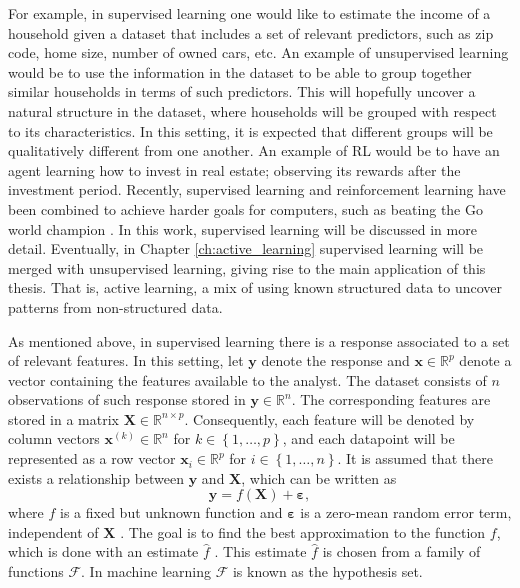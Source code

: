 For example, in supervised learning one would like to estimate the income of a household given a dataset that includes a set of relevant predictors, such as zip code, home size, number of owned cars, etc.
An example of unsupervised learning would be to use the information in the dataset to be able to group together similar households in terms of such predictors. This will hopefully uncover a natural structure in the dataset, where households will be grouped with respect to its characteristics. In this setting, it is expected that different groups will be qualitatively different from one another.
An example of RL would be to have an agent learning how to invest in real estate; observing its rewards after the investment period.
Recently, supervised learning and reinforcement learning have been combined to achieve harder goals for computers, such as beating the Go world champion \cite{silver2017mastering}.
In this work, supervised learning will be discussed in more detail. Eventually, in Chapter \ref{ch:active_learning} supervised learning will be merged with unsupervised learning, giving rise to the main application of this thesis. That is, active learning, a mix of using known structured data to uncover patterns from non-structured data.

As mentioned above, in supervised learning there is a response associated to a set of relevant features. In this setting, let $\boldsymbol{y}$ denote the response
and $\boldsymbol{x} \in \mathbb{R}^p$ denote a vector containing the features available to the analyst. The dataset consists of $n$ observations of such response stored in $\boldsymbol{y} \in \mathbb{R}^n$.
The corresponding features are stored in a matrix $\boldsymbol{X} \in \mathbb{R}^{n \times p}$. Consequently, each feature will be denoted by column vectors $\boldsymbol{x}^{(k)} \in \mathbb{R}^n$ for $k \in \left\{1, \hdots, p \right\}$, and each datapoint will be represented as a row vector $\boldsymbol{x}_i \in \mathbb{R}^p$ for $i \in \left\{1, \hdots, n \right\}$.
It is assumed that there exists a relationship between $\boldsymbol{y}$ and $\boldsymbol{X}$, which can be written as
\begin{equation}
  \label{eq:general_learning_model}
  \boldsymbol{y} = f(\boldsymbol{X}) + \boldsymbol{\varepsilon},
\end{equation}
where $f$ is a fixed but unknown function and $\boldsymbol{\varepsilon}$ is a zero-mean random error term, independent of $\boldsymbol{X}$ \cite[p.~16]{james2013introduction}.
The goal is to find the best approximation to the function $f$, which is done with an estimate $\hat{f}$ \cite[p.~17]{james2013introduction}.
This estimate $\hat{f}$ is chosen from a family of functions $\mathcal{F}$. In machine learning $\mathcal{F}$ is known as the hypothesis set.

